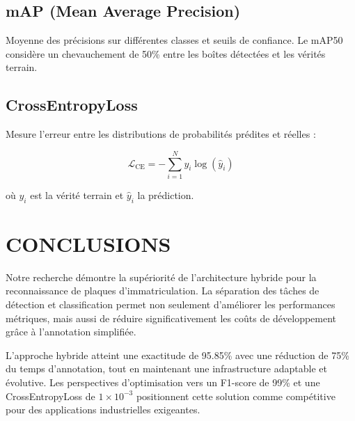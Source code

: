 \documentclass[letterpaper, 10 pt, conference]{ieeeconf}  %
\begin{document}
\subsection{mAP (Mean Average Precision)}

Moyenne des précisions sur différentes classes et seuils de confiance. Le mAP50 considère un chevauchement de 50\% entre les boîtes détectées et les vérités terrain.

\subsection{CrossEntropyLoss}

Mesure l'erreur entre les distributions de probabilités prédites et réelles :

\begin{equation}
\mathcal{L}_{\text{CE}} = -\sum_{i=1}^{N} y_i \log(\hat{y}_i)
\end{equation}

où $y_i$ est la vérité terrain et $\hat{y}_i$ la prédiction.

\section{CONCLUSIONS}

Notre recherche démontre la supériorité de l'architecture hybride pour la reconnaissance de plaques d'immatriculation. La séparation des tâches de détection et classification permet non seulement d'améliorer les performances métriques, mais aussi de réduire significativement les coûts de développement grâce à l'annotation simplifiée.

L'approche hybride atteint une exactitude de 95.85\% avec une réduction de 75\% du temps d'annotation, tout en maintenant une infrastructure adaptable et évolutive. Les perspectives d'optimisation vers un F1-score de 99\% et une CrossEntropyLoss de $1 \times 10^{-3}$ positionnent cette solution comme compétitive pour des applications industrielles exigeantes.

\addtolength{\textheight}{-12cm}   %

\end{document}
